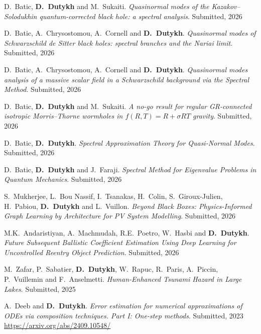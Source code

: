 \documentclass[final, a4paper, oneside, 12pt]{article}
\numberwithin{equation}{section}
\begin{document}
\begin{etaremune}

  \item D.~Batic, \textbf{D.~Dutykh} and M.~Sukaiti. \textit{Quasinormal modes of the Kazakov--Solodukhin quantum-corrected black hole: a spectral analysis}. Submitted, 2026 %

  \item D.~Batic, A.~Chrysostomou, A.~Cornell and \textbf{D.~Dutykh}. \textit{Quasinormal modes of Schwarzschild de Sitter black holes: spectral branches and the Nariai limit}. Submitted, 2026 %

  \item D.~Batic, A.~Chrysostomou, A.~Cornell and \textbf{D.~Dutykh}. \textit{Quasinormal modes analysis of a massive scalar field in a Schwarzschild background via the Spectral Method}. Submitted, 2026 %

  \item D.~Batic, \textbf{D.~Dutykh} and M.~Sukaiti. \textit{A no-go result for regular GR-connected isotropic Morris--Thorne wormholes in $f(R, T) = R + \sigma R T$ gravity}. Submitted, 2026 %
  
  \item D.~Batic, \textbf{D.~Dutykh}. \textit{Spectral Approximation Theory for Quasi-Normal Modes}. Submitted, 2026 %

  \item D.~Batic, \textbf{D.~Dutykh} and J.~Faraji. \textit{Spectral Method for Eigenvalue Problems in Quantum Mechanics}. Submitted, 2026 %

  \item S.~Mukherjee, L.~Bou Nassif, I.~Tsanakas, H.~Colin, S.~Giroux-Julien, H.~Pabiou, \textbf{D.~Dutykh} and L.~Vuillon. \textit{Beyond Black Boxes: Physics-Informed Graph Learning by Architecture for PV System Modelling}. Submitted, 2026 %

  \item M.K.~Andaristiyan, A.~Machmudah, R.E.~Poetro, W.~Hasbi and \textbf{D.~Dutykh}. \textit{Future Subsequent Ballistic Coefficient Estimation Using Deep Learning for Uncontrolled Reentry Object Prediction}. Submitted, 2026 %
  
  \item M.~Zafar, P.~Sabatier, \textbf{D.~Dutykh}, W.~Rapuc, R.~Paris, A.~Piccin, P.~Vuillemin and F.~Anselmetti. \textit{Human-Enhanced Tsunami Hazard in Large Lakes}. Submitted, 2025 %

  \item A.~Deeb and \textbf{D.~Dutykh}. \textit{Error estimation for numerical approximations of ODEs via composition techniques. Part I: One-step methods}. Submitted, 2023 \\ %
  \url{https://arxiv.org/abs/2409.10548/}

\end{etaremune}
\end{document}
